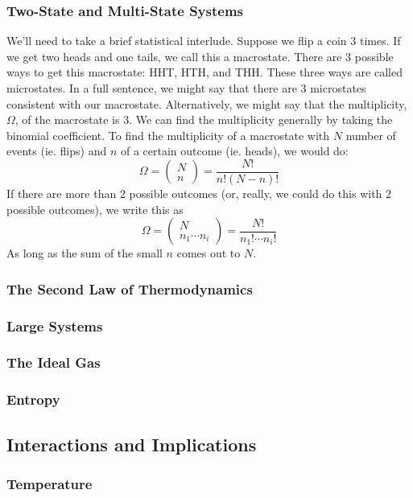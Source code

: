 \documentclass[a4paper]{article}
\begin{document}
\subsubsection{Two-State and Multi-State Systems}
We'll need to take a brief statistical interlude. Suppose we flip a coin 3
times. If we get two heads and one tails, we call this a macrostate. There are
3 possible ways to get this macrostate: HHT, HTH, and THH. These three ways are
called microstates. In a full sentence, we might say that there are 3
microstates consistent with our macrostate. Alternatively, we might say that
the multiplicity, $\Omega$, of the macrostate is 3. We can find the
multiplicity generally by taking the binomial coefficient. To find the
multiplicity of a macrostate with $N$ number of events (ie. flips) and $n$ of a
certain outcome (ie. heads), we would do:
\[
	\Omega = \begin{pmatrix}N\\n\end{pmatrix} = \frac{N!}{n!(N-n)!}
\]
If there are more than 2 possible outcomes (or, really, we could do this with 2
possible outcomes), we write this as
\[
	\Omega = \begin{pmatrix}N\\n_1\cdots n_i\end{pmatrix}
	= \frac{N!}{n_1!\cdots n_i!}
\]
As long as the sum of the small $n$ comes out to $N$.

\subsubsection{The Second Law of Thermodynamics}
\subsubsection{Large Systems}
\subsubsection{The Ideal Gas}
\subsubsection{Entropy}

\subsection{Interactions and Implications}
\subsubsection{Temperature}
\end{document}
